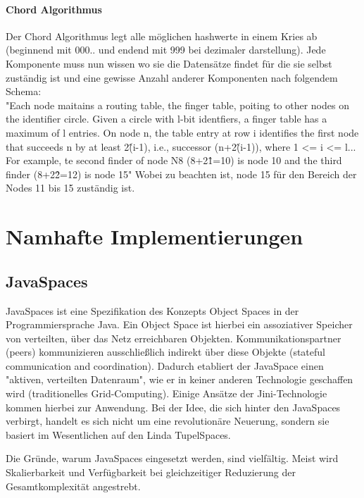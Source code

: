 \documentclass[a4paper,12pt]{scrreprt}
\begin{document}
				\subsubsection{Chord Algorithmus}
					
					Der Chord Algorithmus legt alle möglichen hashwerte in einem Kries ab (beginnend mit 000.. und endend mit 999 bei dezimaler darstellung). Jede Komponente muss nun wissen wo sie die Datensätze findet für die sie selbst zuständig ist und eine gewisse Anzahl anderer Komponenten nach folgendem Schema:\\
					"Each node maitains a routing table, the finger table, poiting to other nodes on the identifier circle. Given a circle with l-bit identfiers, a finger table has a maximum of l entries. On node n, the table entry at row i identifies the first node that succeeds n by at least 2\^(i-1), i.e., successor (n+2\^(i-1)), where 1 <= i <= l... For example, te second finder of node N8 (8+2\^1=10) is node 10 and the third finder (8+2\^2=12) is node 15" Wobei zu beachten ist, node 15 für den Bereich der Nodes 11 bis 15 zuständig ist. %
					\\
	
\chapter{Namhafte Implementierungen}
	\section{JavaSpaces}
		JavaSpaces ist eine Spezifikation des Konzepts Object Spaces in der Programmiersprache Java. Ein Object Space ist hierbei ein assoziativer Speicher von verteilten, über das Netz erreichbaren Objekten. Kommunikationspartner (peers) kommunizieren ausschließlich indirekt über diese Objekte (stateful communication and coordination). Dadurch etabliert der JavaSpace einen "aktiven, verteilten Datenraum", wie er in keiner anderen Technologie geschaffen wird (traditionelles Grid-Computing). Einige Ansätze der Jini-Technologie kommen hierbei zur Anwendung. Bei der Idee, die sich hinter den JavaSpaces verbirgt, handelt es sich nicht um eine revolutionäre Neuerung, sondern sie basiert im Wesentlichen auf den Linda TupelSpaces.
		
		Die Gründe, warum JavaSpaces eingesetzt werden, sind vielfältig. Meist wird Skalierbarkeit und Verfügbarkeit bei gleichzeitiger Reduzierung der Gesamtkomplexität angestrebt.
		
\end{document}

